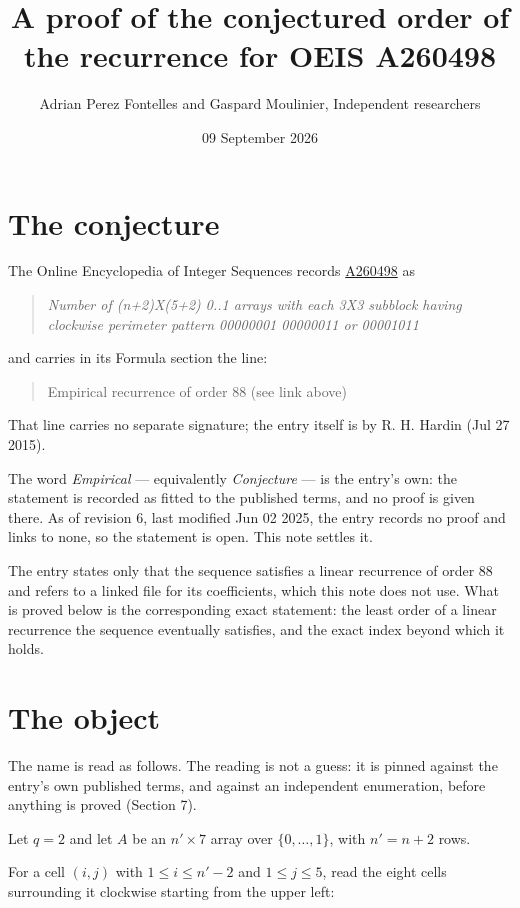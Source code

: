\documentclass[11pt]{article}
\title{A proof of the conjectured order of the recurrence for OEIS A260498}
\author{Adrian Perez Fontelles and Gaspard Moulinier, Independent researchers}
\date{09 September 2026}
\theoremstyle{definition}
\begin{document}
\maketitle
\section{The conjecture}

The Online Encyclopedia of Integer Sequences records \href{https://oeis.org/A260498}{A260498} as

\begin{quote}\itshape Number of (n+2)X(5+2) 0..1 arrays with each 3X3 subblock having clockwise perimeter pattern 00000001 00000011 or 00001011\end{quote}

and carries in its Formula section the line:

\begin{quote}\ttfamily Empirical recurrence of order 88 (see link above)\end{quote}

That line carries no separate signature; the entry itself is by R. H. Hardin (Jul 27 2015).

The word {\itshape Empirical} --- equivalently {\itshape Conjecture} --- is the entry's own: the statement is recorded as fitted to the published terms, and no proof is given there. As of revision 6, last modified Jun 02 2025, the entry records no proof and links to none, so the statement is open. This note settles it.

The entry states only that the sequence satisfies a linear recurrence of order $88$ and refers to a linked file for its coefficients, which this note does not use. What is proved below is the corresponding exact statement: the least order of a linear recurrence the sequence eventually satisfies, and the exact index beyond which it holds.

\section{The object}

The name is read as follows. The reading is not a guess: it is pinned against the entry's own published terms, and against an independent enumeration, before anything is proved (Section 7).

Let $q = 2$ and let $A$ be an $n' \times 7$ array over $\{0,\dots,1\}$, with $n' = n + 2$ rows.

For a cell $(i,j)$ with $1 \le i \le n'-2$ and $1 \le j \le 5$, read the eight cells surrounding it clockwise starting from the upper left:
\end{document}
